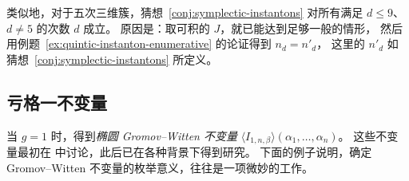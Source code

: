 类似地，对于五次三维簇，猜想~\ref{conj:symplectic-instantons} 对所有满足 $d\leq9$、$d\ne5$ 的次数 $d$ 成立。
原因是：取可积的 $J$，就已能达到足够一般的情形，
然后用例题~\ref{ex:quintic-instanton-enumerative} 的论证得到 $n_d=n'_d$，
这里的 $n'_d$ 如猜想~\ref{conj:symplectic-instantons} 所定义。

\subsection{亏格一不变量}\label{subsec:genus-one-invariants}
当 $g=1$ 时，得到\emph{椭圆 Gromov--Witten 不变量}
$\langle I_{1,n,\beta}\rangle(\alpha_1,\ldots,\alpha_n)$。
这些不变量最初在  中讨论，此后已在各种背景下得到研究。
下面的例子说明，确定 Gromov--Witten 不变量的枚举意义，往往是一项微妙的工作。
